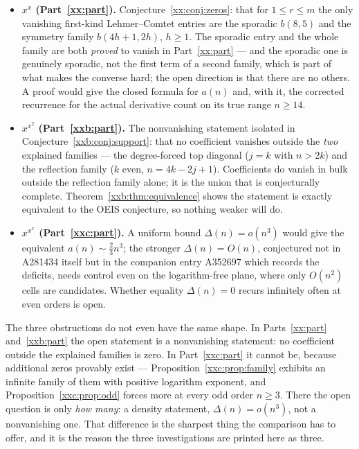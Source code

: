 \documentclass[11pt,a4paper]{article}
\numberwithin{equation}{section}
\theoremstyle{definition}
\theoremstyle{remark}
\theoremstyle{plain}
\begin{document}
\begin{itemize}[leftmargin=1.6em,itemsep=3pt]
\item \textbf{$x^x$ (Part~\ref{xx:part}).}  Conjecture~\ref{xx:conj:zeros}: that
 for $1\le r\le m$ the only vanishing first-kind Lehmer--Comtet entries are
 the sporadic $b(8,5)$ and the symmetry family $b(4h+1,2h)$, $h\ge1$.  The
 sporadic entry and the whole family are both \emph{proved} to vanish in
 Part~\ref{xx:part} --- and the sporadic one is genuinely sporadic, not the
 first term of a second family, which is part of what makes the converse hard;
 the open direction is that there are no others.  A proof would give the closed formula for $a(n)$ and,
 with it, the corrected recurrence for the actual derivative count on its true
 range $n\ge14$.
\item \textbf{$x^{x^2}$ (Part~\ref{xxb:part}).}  The nonvanishing statement
 isolated in Conjecture~\ref{xxb:conj:support}: that no coefficient vanishes
 outside the \emph{two} explained families --- the degree-forced top diagonal
 ($j=k$ with $n>2k$) and the reflection family ($k$ even, $n=4k-2j+1$).
 Coefficients do vanish in bulk outside the reflection family alone; it is the
 union that is conjecturally complete.  Theorem~\ref{xxb:thm:equivalence} shows
 the statement is exactly equivalent to the OEIS conjecture, so nothing weaker
 will do.
\item \textbf{$x^{x^x}$ (Part~\ref{xxc:part}).}  A uniform bound
 $\Delta(n)=o(n^3)$ would give the equivalent $a(n)\sim\tfrac23n^3$; the
 stronger $\Delta(n)=O(n)$, conjectured not in A281434 itself but in the
 companion entry A352697 which records the deficits, needs control even on the
 logarithm-free plane, where only $O(n^2)$ cells are candidates.  Whether
 equality $\Delta(n)=0$ recurs infinitely often at even orders is open.
\end{itemize}

The three obstructions do not even have the same shape.  In
Parts~\ref{xx:part} and~\ref{xxb:part} the open statement is a nonvanishing
statement: no coefficient outside the explained families is zero.  In
Part~\ref{xxc:part} it cannot be, because additional zeros provably exist ---
Proposition~\ref{xxc:prop:family} exhibits an infinite family of them with
positive logarithm exponent, and Proposition~\ref{xxc:prop:odd} forces more at
every odd order $n\ge3$.  There the open question is only \emph{how many}: a
density statement, $\Delta(n)=o(n^3)$, not a nonvanishing one.  That difference
is the sharpest thing the comparison has to offer, and it is the reason the
three investigations are printed here as three.
\end{document}
